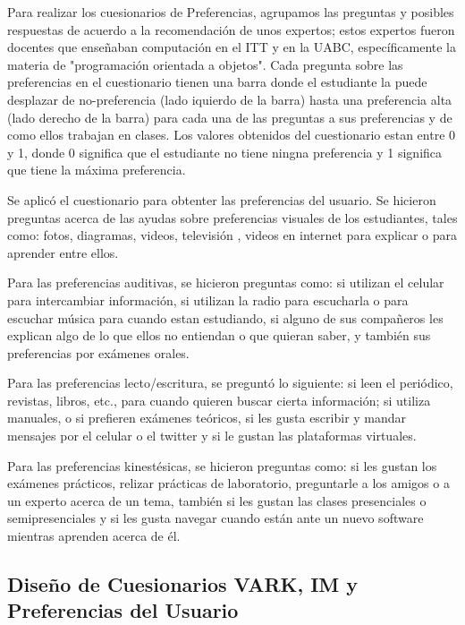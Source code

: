 Para realizar los cuesionarios de Preferencias, agrupamos las preguntas y posibles respuestas de acuerdo a la recomendaci\'{o}n de unos expertos; estos expertos fueron docentes que ense\~{n}aban computaci\'{o}n en el ITT y en la UABC, espec\'{i}ficamente la materia de "programaci\'{o}n orientada a objetos". Cada pregunta sobre las preferencias en el cuestionario tienen una barra donde el estudiante la puede desplazar de no-preferencia (lado iquierdo de la barra) hasta una preferencia alta (lado derecho de la barra) para cada una de las preguntas a sus preferencias y de como ellos trabajan en clases. Los valores obtenidos del cuestionario estan entre 0 y 1, donde 0 significa que el estudiante no tiene ningna preferencia y 1 significa que tiene la m\'{a}xima preferencia. 

Se aplic\'{o} el cuestionario para obtenter las preferencias del usuario. Se hicieron preguntas acerca de las ayudas sobre preferencias visuales de los estudiantes, tales como: fotos, diagramas, videos, televisi\'{o}n , videos en internet para explicar o para aprender entre ellos.

Para las preferencias auditivas, se hicieron preguntas como: si utilizan el celular para intercambiar informaci\'{o}n, si utilizan la radio para escucharla o para escuchar  m\'{u}sica para cuando estan estudiando, si alguno de sus compa\~{n}eros les explican algo de lo que ellos no entiendan o que quieran saber, y tambi\'{en} sus preferencias por ex\'{a}menes orales.

Para las preferencias lecto/escritura, se pregunt\'{o} lo siguiente: si leen el peri\'{o}dico, revistas, libros, etc., para cuando quieren buscar cierta informaci\'{o}n; si utiliza manuales, o si prefieren ex\'{a}menes te\'{o}ricos, si les gusta escribir y mandar mensajes por el celular o el twitter y si le gustan las plataformas virtuales.

Para las preferencias kinest\'{e}sicas, se hicieron preguntas como: si les gustan los ex\'{a}menes pr\'{a}cticos, relizar pr\'{a}cticas de laboratorio, preguntarle a los amigos o a un experto acerca de un tema, tambi\'{e}n si les gustan las clases presenciales o semipresenciales y si les gusta navegar cuando est\'{a}n ante un nuevo software mientras aprenden acerca de \'{e}l.   
   
   
\subsection{Dise\~{n}o de Cuesionarios VARK, IM y Preferencias del Usuario} 

